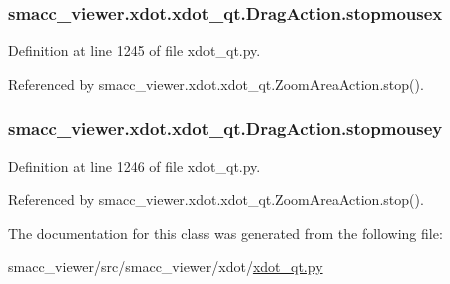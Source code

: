 \subsubsection[{\texorpdfstring{stopmousex}{stopmousex}}]{\setlength{\rightskip}{0pt plus 5cm}smacc\+\_\+viewer.\+xdot.\+xdot\+\_\+qt.\+Drag\+Action.\+stopmousex}\hypertarget{classsmacc__viewer_1_1xdot_1_1xdot__qt_1_1DragAction_a8c2b0875ef5c8670a0a3b0d74d86711d}{}\label{classsmacc__viewer_1_1xdot_1_1xdot__qt_1_1DragAction_a8c2b0875ef5c8670a0a3b0d74d86711d}


Definition at line 1245 of file xdot\+\_\+qt.\+py.



Referenced by smacc\+\_\+viewer.\+xdot.\+xdot\+\_\+qt.\+Zoom\+Area\+Action.\+stop().

\subsubsection[{\texorpdfstring{stopmousey}{stopmousey}}]{\setlength{\rightskip}{0pt plus 5cm}smacc\+\_\+viewer.\+xdot.\+xdot\+\_\+qt.\+Drag\+Action.\+stopmousey}\hypertarget{classsmacc__viewer_1_1xdot_1_1xdot__qt_1_1DragAction_ac642c612a26df48e56059d8ed084ba77}{}\label{classsmacc__viewer_1_1xdot_1_1xdot__qt_1_1DragAction_ac642c612a26df48e56059d8ed084ba77}


Definition at line 1246 of file xdot\+\_\+qt.\+py.



Referenced by smacc\+\_\+viewer.\+xdot.\+xdot\+\_\+qt.\+Zoom\+Area\+Action.\+stop().



The documentation for this class was generated from the following file\+:\begin{DoxyCompactItemize}
\item 
smacc\+\_\+viewer/src/smacc\+\_\+viewer/xdot/\hyperlink{xdot__qt_8py}{xdot\+\_\+qt.\+py}\end{DoxyCompactItemize}
